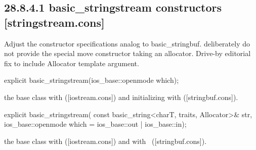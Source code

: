 \documentclass[ebook,11pt,article]{memoir}
\renewcommand{\iref}[1]{[#1]}
\begin{document}
\subsection{28.8.4.1 basic\_stringstream constructors [stringstream.cons]}
\begin{em}
Adjust the constructor specifications analog to basic_stringbuf. deliberately do not provide the special move constructor taking an allocator. Drive-by editorial fix to include Allocator template argument.
\end{em}

\begin{itemdecl}
explicit basic_stringstream(ios_base::openmode which);
\end{itemdecl}

\begin{itemdescr}
\pnum
\effects
{} the base class with
(\iref{iostream.cons})
and initializing  with %
(\iref{stringbuf.cons}).
\end{itemdescr}

%
\begin{itemdecl}
explicit basic_stringstream(
  const basic_string<charT, traits, Allocator>& str,
  ios_base::openmode which = ios_base::out | ios_base::in);
\end{itemdecl}

\begin{itemdescr}
\pnum
\effects
{} the base class with
(\iref{iostream.cons})
and  with%
~(\iref{stringbuf.cons}).
\end{itemdescr}
\end{document}
